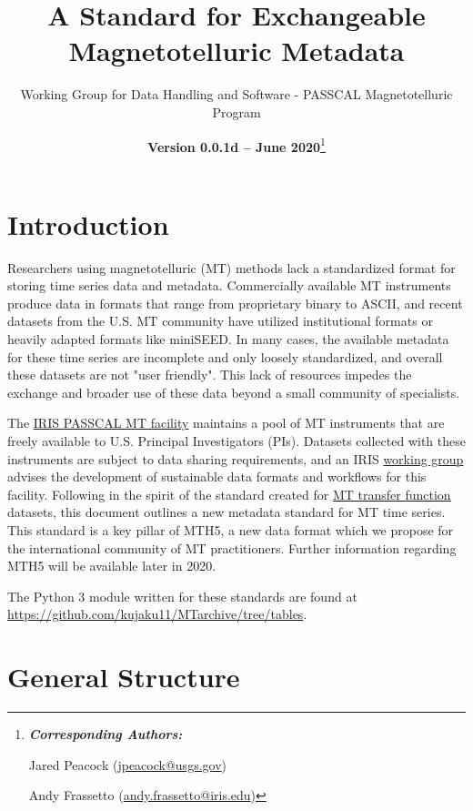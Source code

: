 \documentclass[12pt]{article}
\title{A Standard for Exchangeable Magnetotelluric Metadata}
\date{\textbf{Version 0.0.1d -- June 2020}\footnote{\noindent\textbf{\textit{Corresponding Authors:}}
		
		Jared Peacock (\url{jpeacock@usgs.gov})
		
		Andy Frassetto (\url{andy.frassetto@iris.edu})}}
\author[1]{Working Group for Data Handling and Software - PASSCAL Magnetotelluric Program}
\affil[1]{Portable Array Seismic Studies of the Continental Lithosphere, Incorporated Research Institutions for Seismology}
\begin{document}
	
\maketitle

\tableofcontents
\vspace{1cm}


\newpage

\section{Introduction}

Researchers using magnetotelluric (MT) methods lack a standardized format for storing time series data and metadata. Commercially available MT instruments produce data in formats that range from proprietary binary to ASCII, and recent datasets from the U.S. MT community have utilized institutional formats or heavily adapted formats like miniSEED. In many cases, the available metadata for these time series are incomplete and only loosely standardized, and overall these datasets are not "user friendly". This lack of resources impedes the exchange and broader use of these data beyond a small community of specialists.

The \href{https://www.iris.edu/hq/programs/passcal/magnetotelluricnstrumentation}{IRIS PASSCAL MT facility} maintains a pool of MT instruments that are freely available to U.S. Principal Investigators (PIs). Datasets collected with these instruments are subject to data sharing requirements, and an IRIS \href{https://www.iris.edu/hq/aboutris/governance/mtoft}{working group} advises the development of sustainable data formats and workflows for this facility. Following in the spirit of the standard created for \href{https://library.seg.org/doi/10.1190/geo2018-0679.1}{MT transfer function} datasets, this document outlines a new metadata standard for MT time series. This standard is a key pillar of MTH5, a new data format which we propose for the international community of MT practitioners. Further information regarding MTH5 will be available later in 2020.

The Python 3 module written for these standards are found at \url{https://github.com/kujaku11/MTarchive/tree/tables}.

\section{General Structure}
\end{document}
